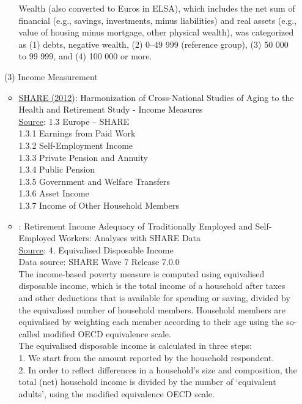 \documentclass[12pt]{article}
\begin{document}
\begin{itemize}
\begin{itemize}
        Wealth (also converted to Euros in ELSA), which includes the net sum of financial (e.g., savings, investments, minus liabilities) and real assets (e.g., value of housing minus mortgage, other physical wealth), was categorized as (1) debts, negative wealth, (2) 0–49 999 (reference group), (3) 50 000 to 99 999, and (4) 100 000 or more.
    \end{itemize}
    \item[(3)] Income Measurement
    \begin{itemize}
        \item \href{https://www.rand.org/pubs/working_papers/WR861z5.html}{SHARE (2012)}: Harmonization of Cross-National Studies of Aging to the Health and Retirement Study - Income Measures \\
        \uline{Source}: 1.3 Europe – SHARE \\
        1.3.1 Earnings from Paid Work \\
        1.3.2 Self-Employment Income \\
        1.3.3 Private Pension and Annuity \\
        1.3.4 Public Pension \\
        1.3.5 Government and Welfare Transfers \\
        1.3.6 Asset Income \\
        1.3.7 Income of Other Household Members
        \item \cite{pettinicchi2019retirement}: Retirement Income Adequacy of Traditionally Employed and Self-Employed Workers: Analyses with SHARE Data \\
        \uline{Source}: 4. Equivalised Disposable Income \\
        Data source: SHARE Wave 7 Release 7.0.0 \\
        The income-based poverty measure is computed using equivalised disposable income, which is the total income of a household after taxes and other deductions that is available for spending or saving, divided by the equivalised number of household members. Household members are equivalised by weighting each member according to their age using the so-called modified OECD equivalence scale. \\
        The equivalised disposable income is calculated in three steps: \\ 
        1. We start from the amount reported by the household respondent. \\
        2. In order to reflect differences in a household's size and composition, the total (net) household income is divided by the number of ‘equivalent adults’, using the modified equivalence OECD scale. \\

\end{itemize}
\end{itemize}
\end{document}

